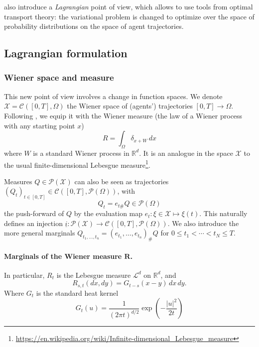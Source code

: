 \documentclass{article}
\newcommand{\RR}{\mathbb{R}}
\newcommand{\calC}{\mathcal{C}}
\newcommand{\calP}{\mathcal{P}}
\newcommand{\calX}{\mathcal{X}}
\numberwithin{equation}{section}
\theoremstyle{definition}
\begin{document}
\textcite{benamou:hal-01295299,benamou2018entropy} also introduce a \textit{Lagrangian} point of view, which allows to use tools from optimal transport theory: the variational problem is changed to optimize over the space of probability distributions on the space of agent trajectories.


\subsection{Lagrangian formulation}

\subsubsection{Wiener space and measure}

This new point of view involves a change in function spaces. We denote $\calX = \calC([0,T], \Omega)$ the Wiener space of (agents') trajectories $[0,T] \rightarrow\Omega$. Following \cites{benamou:hal-01295299,benamou2015lagrangian}, we equip it with the Wiener measure (the law of a Wiener process with any starting point $x$)
\[
   	R = \int_\Omega \delta_{x + W}\,dx
\]
  	where $W$ is a standard Wiener process in $\RR^d$. It is an analogue in the space $\calX$ to the usual finite-dimensional Lebesgue measure\footnote{\url{https://en.wikipedia.org/wiki/Infinite-dimensional_Lebesgue_measure}}.
  	
  	Measures $Q \in \calP(\calX)$ can also be seen as trajectories $(Q_t)_{t\in[0,T]} \in \calC([0,T], \calP(\Omega))$, with
\[
   	Q_t = e_{t\#}Q \in \calP(\Omega)
\]
the push-forward of $Q$ by the evaluation map $e_t\colon \xi\in\calX\longmapsto \xi(t)$. This naturally defines an injection $\underline{i} \colon \calP(\calX) \rightarrow \calC([0,T], \calP(\Omega))$. We also introduce the more general marginals $Q_{t_1,\ldots,t_n} = (e_{t_1},\ldots, e_{t_n})_\# Q$ for $0\leq t_1 < \cdots < t_N \leq T$.

\paragraph{Marginals of the Wiener measure $\boldsymbol{R}$.} In particular, $R_t$ is the Lebesgue measure $\mathcal{L}^d$ on $\RR^d$, and
\begin{equation}\label{eq:2MarginWienerMeasure}
   	R_{s,t}(dx,dy) = G_{t-s}(x-y)\,dx\,dy.
\end{equation}
Where $G_t$ is the standard heat kernel
\[
	G_t(u) =
	\frac{1}{(2\pi t)^{d/2}} \exp\left(-\frac{|u|^2}{2t}\right)
\]
\end{document}
